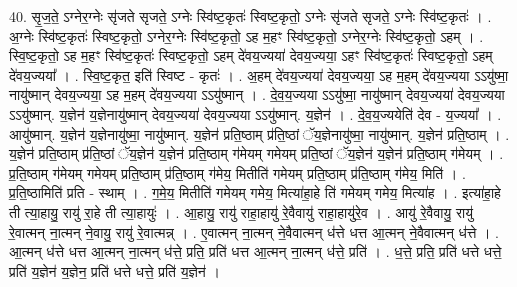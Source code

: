 \documentclass[17pt]{extarticle}
\begin{document}
40. सृ॒ज॒ते॒ ऽग्नेर॒ग्नेः सृ॑जते सृजते॒ ऽग्नेः स्वि॑ष्ट॒कृतः॑ स्विष्ट॒कृतो॒ ऽग्नेः सृ॑जते सृजते॒ ऽग्नेः स्वि॑ष्ट॒कृतः॑ । . अ॒ग्नेः स्वि॑ष्ट॒कृतः॑ स्विष्ट॒कृतो॒ ऽग्नेर॒ग्नेः स्वि॑ष्ट॒कृतो॒ ऽह म॒हꣳ स्वि॑ष्ट॒कृतो॒ ऽग्नेर॒ग्नेः स्वि॑ष्ट॒कृतो॒ ऽहम् । . स्वि॒ष्ट॒कृतो॒ ऽह म॒हꣳ स्वि॑ष्ट॒कृतः॑ स्विष्ट॒कृतो॒ ऽहम् दे॑वय॒ज्यया॑ देवय॒ज्यया॒ ऽहꣳ स्वि॑ष्ट॒कृतः॑ स्विष्ट॒कृतो॒ ऽहम् दे॑वय॒ज्यया᳚ । . स्वि॒ष्ट॒कृत॒ इति॑ स्विष्ट - कृतः॑ । . अ॒हम् दे॑वय॒ज्यया॑ देवय॒ज्यया॒ ऽह म॒हम् दे॑वय॒ज्यया ऽऽयु॑ष्मा॒ नायु॑ष्मान् देवय॒ज्यया॒ ऽह म॒हम् दे॑वय॒ज्यया ऽऽयु॑ष्मान् । . दे॒व॒य॒ज्यया ऽऽयु॑ष्मा॒ नायु॑ष्मान् देवय॒ज्यया॑ देवय॒ज्यया ऽऽयु॑ष्मान्. य॒ज्ञेन॑ य॒ज्ञेनायु॑ष्मान् देवय॒ज्यया॑ देवय॒ज्यया ऽऽयु॑ष्मान्. य॒ज्ञेन॑ । . दे॒व॒य॒ज्ययेति॑ देव - य॒ज्यया᳚ । . आयु॑ष्मान्. य॒ज्ञेन॑ य॒ज्ञेनायु॑ष्मा॒ नायु॑ष्मान्. य॒ज्ञेन॑ प्रति॒ष्ठाम् प्र॑ति॒ष्ठां ॅय॒ज्ञेनायु॑ष्मा॒ नायु॑ष्मान्. य॒ज्ञेन॑ प्रति॒ष्ठाम् । . य॒ज्ञेन॑ प्रति॒ष्ठाम् प्र॑ति॒ष्ठां ॅय॒ज्ञेन॑ य॒ज्ञेन॑ प्रति॒ष्ठाम् ग॑मेयम् गमेयम् प्रति॒ष्ठां ॅय॒ज्ञेन॑ य॒ज्ञेन॑ प्रति॒ष्ठाम् ग॑मेयम् । . प्र॒ति॒ष्ठाम् ग॑मेयम् गमेयम् प्रति॒ष्ठाम् प्र॑ति॒ष्ठाम् ग॑मेय॒ मितीति॑ गमेयम् प्रति॒ष्ठाम् प्र॑ति॒ष्ठाम् ग॑मेय॒ मिति॑ । . प्र॒ति॒ष्ठामिति॑ प्रति - स्थाम् । . ग॒मे॒य॒ मितीति॑ गमेयम् गमेय॒ मित्या॑हा॒हे ति॑ गमेयम् गमेय॒ मित्या॑ह । . इत्या॑हा॒हे ती त्या॒हायु॒ रायु॑ रा॒हे ती त्या॒हायुः॑ । . आ॒हायु॒ रायु॑ राहा॒हायु॑ रे॒वैवायु॑ राहा॒हायु॑रे॒व । . आयु॑ रे॒वैवायु॒ रायु॑ रे॒वात्मन् ना॒त्मन् ने॒वायु॒ रायु॑ रे॒वात्मन्न् । . ए॒वात्मन् ना॒त्मन् ने॒वैवात्मन् ध॑त्ते धत्त आ॒त्मन् ने॒वैवात्मन् ध॑त्ते । . आ॒त्मन् ध॑त्ते धत्त आ॒त्मन् ना॒त्मन् ध॑त्ते॒ प्रति॒ प्रति॑ धत्त आ॒त्मन् ना॒त्मन् ध॑त्ते॒ प्रति॑ । . ध॒त्ते॒ प्रति॒ प्रति॑ धत्ते धत्ते॒ प्रति॑ य॒ज्ञेन॑ य॒ज्ञेन॒ प्रति॑ धत्ते धत्ते॒ प्रति॑ य॒ज्ञेन॑ । \newline
\end{document}
